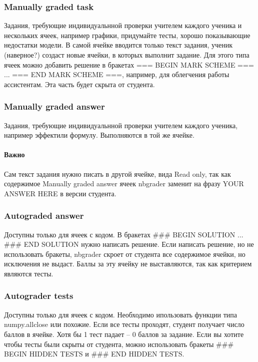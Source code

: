 \documentclass[a4paper,12pt]{article}
\begin{document}
\subsubsection{Manually graded task}

Задания, требующие индивидуальнной проверки учителем каждого ученика и нескольких ячеек, например  графики, придумайте тесты, хорошо показывающие недостатки модели\grqq. В самой ячейке вводится только текст задания, ученик (наверное?) создаст новые ячейки, в которых выполнит задание.
Для этого типа ячеек можно добавить решение в бракетах === BEGIN MARK SCHEME === ... === END MARK SCHEME ===,
например, для облегчения работы ассистентам. Эта часть будет скрыта от студента.

\subsubsection{Manually graded answer}

Задания, требующие индивидуальнной проверки учителем каждого ученика, например  эффект\grqq или  формулу\grqq. Выполняются в той же ячейке.
\paragraph{Важно}Сам текст задания нужно писать в другой ячейке, вида Read only, так как содержимое Manually graded answer ячеек nbgrader заменит на фразу YOUR ANSWER HERE в версии студента.

\subsubsection{Autograded answer}

Доступны только для ячеек с кодом. В бракетах \#\#\# BEGIN SOLUTION ... \#\#\# END SOLUTION нужно написать решение. 
Если написать решение, но не использовать бракеты, nbgrader скроет от студента все содержимое ячейки, но исключения не выдаст. Баллы за эту ячейку не выставляются, так как критерием являются тесты. 

\subsubsection{Autograder tests}

Доступны только для ячеек с кодом. Необходимо ипользовать функции типа numpy.allclose или похожие. Если все тесты проходят, студент получает число баллов в ячейке. Хотя бы 1 тест падает -- 0 баллов за задание.
Если вы хотите чтобы тесты были скрыты от студента, можно использовать бракеты \#\#\# BEGIN HIDDEN TESTS и \#\#\# END HIDDEN TESTS.
\end{document}
